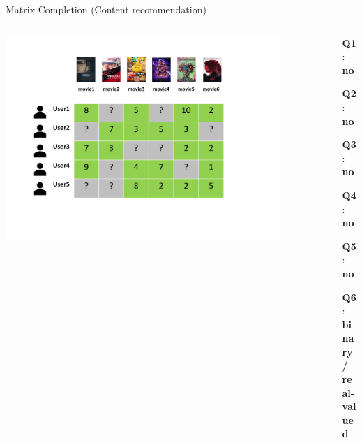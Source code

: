 \documentclass[]{beamer}
\begin{document}
\begin{frame}
{Matrix Completion (Content recommendation)}

\begin{columns}

\begin{column}{9cm}
\includegraphics[width=0.9\textwidth,trim = 0 0 100 0,clip]{Dimitris_figures/MC_movie_recommendation.pdf}
\end{column}

\begin{column}{7cm}
\begin{itemize}
\itemindent=2pt    \item [\textbf{Q1}:] \textbf{no}
\itemindent=2pt    \item [\textbf{Q2}:] \textbf{no}
\itemindent=2pt    \item [\textbf{Q3}:] \textbf{no}
\itemindent=2pt    \item [\textbf{Q4}:] \textbf{no}
\itemindent=2pt    \item [\textbf{Q5}:] \textbf{no}
\itemindent=2pt    \item [\textbf{Q6}:]  \textbf{binary/\\real-valued}
\end{itemize}
\end{column}

\end{columns}
\end{frame}
\end{document}
